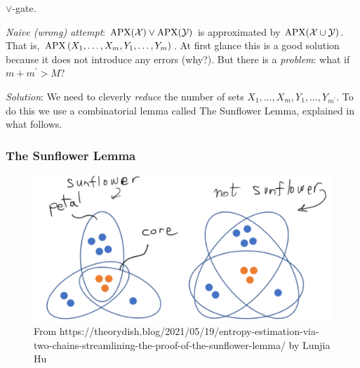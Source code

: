 $\lor$-gate.

\textit{Naive (wrong) attempt}: $\operatorname{\mathrm{APX}}(\mathcal X)
\lor \operatorname{\mathrm{APX}}(\mathcal Y)$ is approximated by $\operatorname{\mathrm{APX}}(\mathcal X \cup \mathcal Y)$. That is, $\operatorname{\mathrm{APX}}\left(X_1, \ldots, X_m, Y_1, \ldots, Y_m\right)$. At first glance this is a good solution because it does not introduce any errors (why?). But there is a \textit{problem}: what if $m+m^{\prime}>M$?


\textit{Solution}: We need to cleverly \emph{reduce} the number of sets $X_1, \ldots, X_m, Y_1, \ldots, Y_{m^{\prime}}$. To do this we use a combinatorial lemma called The Sunflower Lemma, explained in what follows. 

\subsubsection{The Sunflower Lemma}

\begin{figure}
    \centering
        \includegraphics[width=0.75\linewidth]{images/sunflower-lemma.png}
    \caption{From https://theorydish.blog/2021/05/19/entropy-estimation-via-two-chains-streamlining-the-proof-of-the-sunflower-lemma/ by Lunjia Hu}
    \label{fig:enter-label}
\end{figure}




